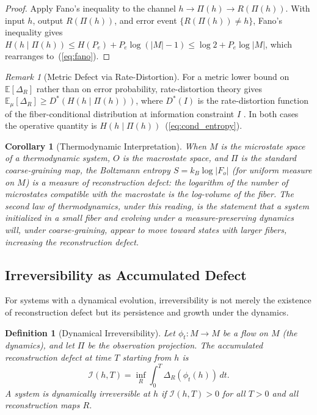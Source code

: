 \documentclass[12pt,a4paper]{article}
\newtheorem{corollary}[theorem]{Corollary}
\newtheorem{definition}[theorem]{Definition}
\theoremstyle{remark}
\newtheorem{remark}{Remark}[section]
\theoremstyle{definition}
\begin{document}
\begin{proof}
Apply Fano's inequality \cite{cover2006} to the channel $h \to \Pi(h)
\to R(\Pi(h))$. With input $h$, output $R(\Pi(h))$, and error event
$\{R(\Pi(h)) \neq h\}$, Fano's inequality gives
$H(h \mid \Pi(h)) \leq H(P_e) + P_e\log(|M|-1) \leq \log 2 + P_e\log|M|$,
which rearranges to~(\ref{eq:fano}).
\end{proof}

\begin{remark}[Metric Defect via Rate-Distortion]
For a metric lower bound on $\mathbb{E}[\Delta_R]$ rather than on error
probability, rate-distortion theory gives
$\mathbb{E}_\mu[\Delta_R] \geq D^*(H(h \mid \Pi(h)))$,
where $D^*(I)$ is the rate-distortion function of the fiber-conditional
distribution at information constraint $I$ \cite{cover2006}. In both
cases the operative quantity is $H(h \mid \Pi(h))$~(\ref{eq:cond_entropy}).
\end{remark}

\begin{corollary}[Thermodynamic Interpretation]
\label{cor:thermo}
When $M$ is the microstate space of a thermodynamic system, $O$ is the
macrostate space, and $\Pi$ is the standard coarse-graining map, the
Boltzmann entropy $S = k_B \log |F_o|$ (for uniform measure on $M$) is
a measure of reconstruction defect: the logarithm of the number of
microstates compatible with the macrostate is the log-volume of the fiber.
The second law of thermodynamics, under this reading, is the statement
that a system initialized in a small fiber and evolving under a
measure-preserving dynamics will, under coarse-graining, appear to move
toward states with larger fibers, increasing the reconstruction defect.
\end{corollary}

\subsection{Irreversibility as Accumulated Defect}

For systems with a dynamical evolution, irreversibility is not merely the
existence of reconstruction defect but its persistence and growth under
the dynamics.

\begin{definition}[Dynamical Irreversibility]
Let $\phi_t : M \to M$ be a flow on $M$ (the dynamics), and let $\Pi$
be the observation projection. The \emph{accumulated reconstruction
defect} at time $T$ starting from $h$ is
\begin{equation}
  \mathcal{I}(h, T) = \inf_R \int_0^T \Delta_R(\phi_t(h))\, dt.
\end{equation}
A system is \emph{dynamically irreversible at $h$} if $\mathcal{I}(h,T) > 0$
for all $T > 0$ and all reconstruction maps $R$.
\end{definition}
\end{document}
